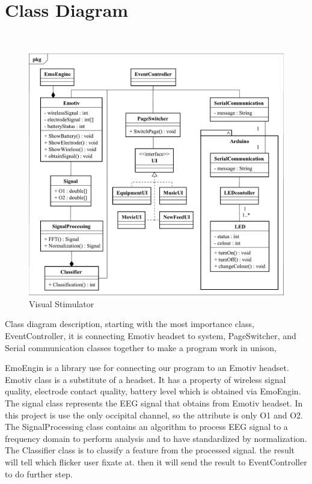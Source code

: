 \section{Class Diagram}
\
\begin{figure}[ht]
	\centering
	\includegraphics[width=\textwidth]{chapter5/Class.pdf}
	\caption{Visual Stimulator}
\end{figure}

Class diagram description, starting with the most importance class, EventController, it is connecting Emotiv headset to system, PageSwitcher, and Serial communication classes together to make a program work in unison,

EmoEngin is a library use for connecting our program to an Emotiv headset. Emotiv class is a substitute of a headset. It has a property of wireless signal quality, electrode contact quality, battery level which is obtained via EmoEngin. The signal class represents the EEG signal that obtains from Emotiv headset. In this project is use the only occipital channel, so the attribute is only O1 and O2. The SignalProcessing class contains an algorithm to process EEG signal to a frequency domain to perform analysis and to have standardized by normalization. The Classifier class is to classify a feature from the processed signal. the result will tell which flicker user fixate at. then it will send the result to EventController to do further step.

